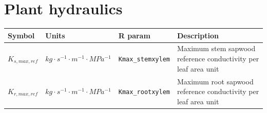 \documentclass[]{book}
\begin{document}
\hypertarget{plant-hydraulics-2}{%
\section{Plant hydraulics}\label{plant-hydraulics-2}}

\begin{longtable}[]{@{}llll@{}}
\toprule
\begin{minipage}[b]{0.11\columnwidth}\raggedright
Symbol\strut
\end{minipage} & \begin{minipage}[b]{0.10\columnwidth}\raggedright
Units\strut
\end{minipage} & \begin{minipage}[b]{0.12\columnwidth}\raggedright
R param\strut
\end{minipage} & \begin{minipage}[b]{0.45\columnwidth}\raggedright
Description\strut
\end{minipage}\tabularnewline
\midrule
\endhead
\begin{minipage}[t]{0.11\columnwidth}\raggedright
\(K_{s,max,ref}\)\strut
\end{minipage} & \begin{minipage}[t]{0.10\columnwidth}\raggedright
\(kg \cdot s^{-1} \cdot m^{-1} \cdot MPa^{-1}\)\strut
\end{minipage} & \begin{minipage}[t]{0.12\columnwidth}\raggedright
\texttt{Kmax\_stemxylem}\strut
\end{minipage} & \begin{minipage}[t]{0.45\columnwidth}\raggedright
Maximum stem sapwood reference conductivity per leaf area unit\strut
\end{minipage}\tabularnewline
\begin{minipage}[t]{0.11\columnwidth}\raggedright
\(K_{r,max,ref}\)\strut
\end{minipage} & \begin{minipage}[t]{0.10\columnwidth}\raggedright
\(kg \cdot s^{-1} \cdot m^{-1} \cdot MPa^{-1}\)\strut
\end{minipage} & \begin{minipage}[t]{0.12\columnwidth}\raggedright
\texttt{Kmax\_rootxylem}\strut
\end{minipage} & \begin{minipage}[t]{0.45\columnwidth}\raggedright
Maximum root sapwood reference conductivity per leaf area unit\strut
\end{minipage}\tabularnewline

\end{longtable}
\end{document}
